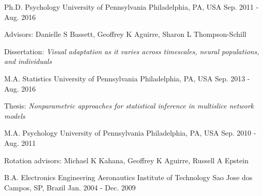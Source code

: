 \begin{cventries}
  \cventry
    {Ph.D. Psychology}
    {University of Pennsylvania}
    {Philadelphia, PA, USA}
    {Sep. 2011 - Aug. 2016}
    {
      \begin{cvitems}
        \item {Advisors: Danielle S Bassett, Geoffrey K Aguirre, Sharon L Thompson-Schill}
        \item {Dissertation: \textit{Visual adaptation as it varies across timescales, neural populations, and individuals}}
      \end{cvitems}
    }
  \cventry
    {M.A. Statistics}
    {University of Pennsylvania}
    {Philadelphia, PA, USA}
    {Sep. 2013 - Aug. 2016}
    {
      \begin{cvitems}
        \item {Thesis: \textit{Nonparametric approaches for statistical inference in multislice network models}}
      \end{cvitems}
    }
  \cventry
    {M.A. Psychology}
    {University of Pennsylvania}
    {Philadelphia, PA, USA}
    {Sep. 2010 - Aug. 2011}
    {
      \begin{cvitems}
        \item {Rotation advisors: Michael K Kahana, Geoffrey K Aguirre, Russell A Epstein}
      \end{cvitems}
    }
  \cventry
    {B.A. Electronics Engineering}
    {Aeronautics Institute of Technology}
    {Sao Jose dos Campos, SP, Brazil}
    {Jan. 2004 - Dec. 2009}
    {
    }
\end{cventries}
